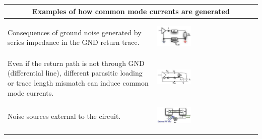 		\begin{table}[h!]
		\centering
		\begin{tabular}{|m{}|m{}|}
				\multicolumn{2}{c}{\textbf{Examples of how common mode currents are generated}}
			\\
			\hline
				Consequences of ground noise generated by series impedance in the GND return trace. 
			& 
				 \begin{center}\includegraphics[width=0.35\textwidth]{images/SeriesImpedance.png}\end{center}  
			\\
			\hline
				Even if the return path is not through GND (differential line), different parasitic loading or trace length mismatch can induce common mode currents.  
			& 
				 \begin{center}\includegraphics[width=0.35\textwidth]{images/ParasiticLoading.png}\end{center}  
			\\
			\hline
				Noise sources external to the circuit. 
			& 
				 \begin{center}\includegraphics[width=0.35\textwidth]{images/ExternalNoise.png}\end{center}  
			\\
			\hline
			\end{tabular}
		\end{table}


